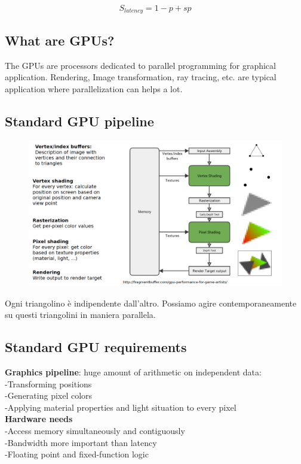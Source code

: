 \begin{equation*}
	S_{latency} = 1 - p + sp
\end{equation*}

\subsection{What are GPUs?}

The GPUs are processors dedicated to parallel programming for
graphical application.
Rendering, Image transformation, ray tracing, etc. are typical
application where parallelization can helps a lot.


\subsection{Standard GPU pipeline}

\begin{figure}[ht]
	\centering
	\includegraphics[width=1\textwidth]{figure_parallel/gpu_pipeline.png}\end{figure}
\FloatBarrier

Ogni triangolino è indipendente dall'altro. Possiamo agire contemporaneamente su questi triangolini in maniera parallela.

\subsection{Standard GPU requirements}

\textbf{Graphics pipeline}: huge amount of arithmetic on independent data:\\
-Transforming positions\\
-Generating pixel colors\\
-Applying material properties and light situation to every pixel\\
\textbf{Hardware needs}\\
-Access memory simultaneously and contiguously\\
-Bandwidth more important than latency\\
-Floating point and fixed-function logic\\

